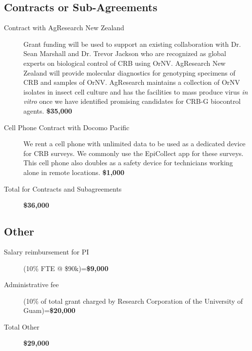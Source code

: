 \documentclass[14pt,english,letterpaper]{scrartcl}
\begin{document}
\subsection{Contracts or Sub-Agreements} 


\begin{description}
	
	\item[Contract with AgResearch New Zealand] Grant funding will be used to support an existing collaboration with Dr. Sean Marshall and Dr. Trevor Jackson who are recognized as global experts on biological control of CRB using OrNV. AgResearch New Zealand will provide molecular diagnostics for genotyping specimens of CRB and samples of OrNV. AgResearch maintains a collection of OrNV isolates in insect cell culture and has the facilities to mass produce virus \textit{in vitro} once we have identified promising candidates for CRB-G biocontrol agents. \textbf{\$35,000}
	
	\item[Cell Phone Contract with Docomo Pacific] We rent a cell phone with unlimited data to be used as a dedicated device for CRB surveys. We commonly use the EpiCollect app for these surveys.  This cell phone also doubles as a safety device for technicians working alone in remote locations. \textbf{\$1,000}
	
	\item[Total for Contracts and Subagreements] \textbf{\$36,000}
	
\end{description}


\subsection{Other} 

\begin{description}
	
	\item[Salary reimbursement for PI] (10\% FTE @ \$90k)=\textbf{\$9,000}
	
	\item[Administrative fee] (10\% of total grant charged by Research Corporation of the University of Guam)=\textbf{\$20,000}
	
	\item[Total Other] \textbf{\$29,000}
	
\end{description}
\end{document}
